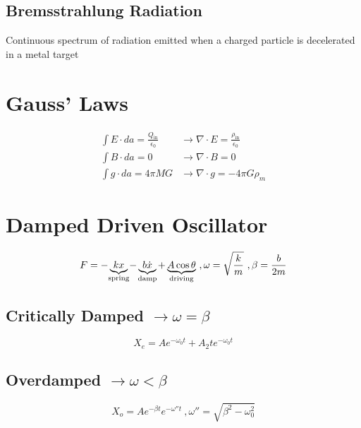 \documentclass[10pt,letter]{article}
\begin{document}
\subsection{Bremsstrahlung Radiation} %
\label{sub:bremsstrahlung_radiation}
Continuous spectrum of radiation emitted when a charged particle is decelerated in a metal target

\section{Gauss' Laws} %
\label{sec:gauss_laws}
\begin{align}
\int E \cdot da = \frac{Q_{\textrm{in}}}{\epsilon_0} &\rightarrow \nabla \cdot E = \frac{\rho_{\textrm{in}}}{\epsilon_0}\\
\int B\cdot da = 0 &\rightarrow \nabla \cdot B = 0\\
\int g\cdot da = 4\pi MG &\rightarrow \nabla \cdot g = -4\pi G \rho_m
\end{align}

\section{Damped Driven Oscillator} %
\label{sec:damped_driven_oscillator}
\begin{equation}
    F=-\underbrace{kx}_{\mathclap{\textrm{spring}}}-\underbrace{b\dot{x}}_{\mathclap{\textrm{damp}}}+\underbrace{A\cos\theta}_{\mathclap{\textrm{driving}}}~, \omega = \sqrt{\frac{k}{m}}~, \beta = \frac{b}{2m}
\end{equation}
\subsection{Critically Damped $\rightarrow \omega = \beta$} %
\label{sub:critically_damped_}
\begin{equation}
    X_e = Ae^{-\omega_0t} + A_2te^{-\omega_0t}
\end{equation}
\subsection{Overdamped $\rightarrow \omega < \beta$} %
\label{sub:overdamped_}
\begin{equation}
    X_o = Ae^{-\beta t}e^{-\omega'' t}~,\omega'' = \sqrt{\beta^2 - \omega_0^2}
\end{equation}
\end{document}
